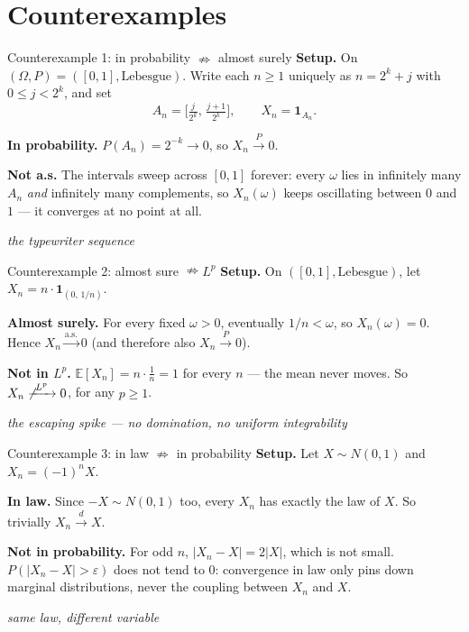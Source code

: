 \documentclass[aspectratio=169]{beamer}
\newcommand{\as}{\xrightarrow{\text{a.s.}}}
\newcommand{\inprob}{\xrightarrow{\ P\ }}
\newcommand{\inlaw}{\xrightarrow{\ d\ }}
\newcommand{\inLp}{\xrightarrow{\ L^p\ }}
\begin{document}
\section{Counterexamples}

\begin{frame}{Counterexample 1: in probability $\nRightarrow$ almost surely}
  \textbf{Setup.} On $(\Omega,P) = ([0,1], \text{Lebesgue})$. Write each $n\ge 1$ uniquely as
  $n = 2^k + j$ with $0 \le j < 2^k$, and set
  \[ A_n = \Big[\tfrac{j}{2^k},\, \tfrac{j+1}{2^k}\Big], \qquad X_n = \mathbf 1_{A_n}. \]

  \textbf{In probability.} $P(A_n) = 2^{-k} \to 0$, so $X_n \inprob 0$.

  \textbf{Not a.s.} The intervals sweep across $[0,1]$ forever: every $\omega$ lies in
  infinitely many $A_n$ \emph{and} infinitely many complements, so $X_n(\omega)$ keeps
  oscillating between $0$ and $1$ --- it converges at no point at all.

  \vfill
  {\small\itshape the typewriter sequence}
\end{frame}

\begin{frame}{Counterexample 2: almost sure $\nRightarrow L^p$}
  \textbf{Setup.} On $([0,1], \text{Lebesgue})$, let $X_n = n \cdot \mathbf 1_{(0,\, 1/n)}$.

  \textbf{Almost surely.} For every fixed $\omega>0$, eventually $1/n < \omega$, so
  $X_n(\omega)=0$. Hence $X_n \as 0$ (and therefore also $X_n \inprob 0$).

  \textbf{Not in $L^p$.} $\mathbb E[X_n] = n \cdot \tfrac1n = 1$ for every $n$ --- the mean
  never moves. So $X_n \not\inLp 0$, for any $p \ge 1$.

  \vfill
  {\small\itshape the escaping spike --- no domination, no uniform integrability}
\end{frame}

\begin{frame}{Counterexample 3: in law $\nRightarrow$ in probability}
  \textbf{Setup.} Let $X \sim N(0,1)$ and $X_n = (-1)^n X$.

  \textbf{In law.} Since $-X \sim N(0,1)$ too, every $X_n$ has exactly the law of $X$.
  So trivially $X_n \inlaw X$.

  \textbf{Not in probability.} For odd $n$, $|X_n - X| = 2|X|$, which is not small.
  $P(|X_n-X|>\varepsilon)$ does not tend to $0$: convergence in law only pins down
  marginal distributions, never the coupling between $X_n$ and $X$.

  \vfill
  {\small\itshape same law, different variable}
\end{frame}
\end{document}
